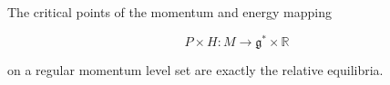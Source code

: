 The critical points of the momentum and energy mapping

$$P \times H: M \rightarrow \mathfrak{g}^* \times \mathbb{R}$$

on a regular momentum level set are exactly the relative equilibria.
